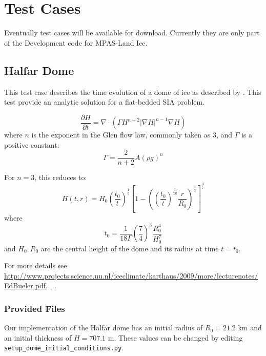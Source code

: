 \chapter{Test Cases}
\label{chap:landice_test_cases}

Eventually test cases will be available for download.  Currently they are only part of the Development code for MPAS-Land Ice.


\FloatBarrier


\section{Halfar Dome}
\label{sec:halfar_description}
This test case describes the time evolution of a dome of ice as described by \citet{Halfar1983}.
This test provide an analytic solution for a flat-bedded SIA problem.

\begin{equation}
    \label{halfar}
    \frac{\partial H}{\partial t} = \nabla \cdot (\Gamma H^{n+2} |\nabla H|^{n-1} \nabla H)
\end{equation}
where $n$ is the exponent in the Glen flow law, commonly taken as 3, and $\Gamma$ is a positive constant:
\begin{equation}
    \Gamma = \frac{2}{n+2} A (\rho g)^n
\end{equation}

For $n=3$, this reduces to:
\begin{equation}
    H(t,r) = H_0 \left(\frac{t_0}{t}\right)^\frac{1}{9}  \left[ 1 - \left(  \left( \frac{t_0}{t} \right) ^ \frac{1}{18} \frac{r}{R_0} \right)^\frac{4}{3} \right] ^ \frac{3}{7}
\end{equation}
where
\begin{equation}
    t_0 = \frac{1}{18\Gamma} \left( \frac{7}{4} \right)^3 \frac{R_0^4}{H_0^7}
\end{equation}
and $H_0, R_0$ are the central height of the dome and its radius at time $t=t_0$.

For more details see \url{http://www.projects.science.uu.nl/iceclimate/karthaus/2009/more/lecturenotes/EdBueler.pdf},  \citet{Bueler2005}, \citet{Halfar1983}.



\subsection{Provided Files}
\label{subsec:halfar_files}
Our implementation of the Halfar dome has an initial radius of $R_0=21.2$ km and an initial thickness of $H=707.1$ m.
These values can be changed by editing \texttt{setup\_dome\_initial\_conditions.py}.

